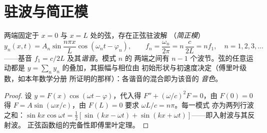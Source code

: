 \section{驻波与简正模}

\begin{proposition}[两端固定弦的简正模]\label{prop:b2:waves-on-strings:modes}
两端固定于 $x = 0$ 与 $x = L$ 处的弦，存在正弦驻波解
（\emph{简正模}）
\[
y_n(x, t) = A_n\sin\frac{n\pi x}{L}\cos(\omega_nt - \varphi_n) , \qquad
f_n = \frac{\omega_n}{2\pi} = n\,\frac{c}{2L} = n f_1 , \quad n = 1, 2, 3, \dots
\]
——基音 $f_1 = c/2L$ 及其\emph{谐音}。模式 $n$ 的
两端之间有 $n - 1$ 个波节。弦的任意运动都是
$y = \sum_ny_n$ 的叠加，其振幅与相位由
初始形状与初速度决定（傅里叶级数，如本年数学分册
所证明的那样）：各谐音的混合即为该音的
\emph{音色}。
\end{proposition}

\begin{proof}
设 $y = F(x)\cos(\omega t - \varphi)$，代入得 $F'' + (\omega/c)^2F = 0$，由 $F(0) = 0$ 得
$F = A\sin(\omega x/c)$，由 $F(L) = 0$ 要求 $\omega L/c = n\pi$。每一模式
亦为两列行波之和：$\sin kx\cos\omega t = \tfrac12[\sin(kx -
\omega t) + \sin(kx + \omega t)]$——即入射波与其反射波。
正弦函数组的完备性即傅里叶定理。
\end{proof}

